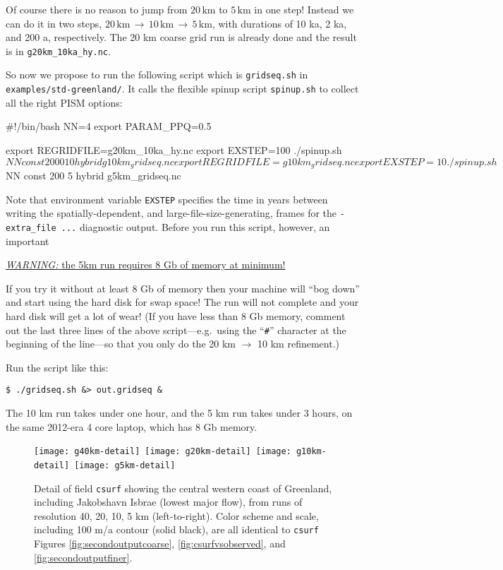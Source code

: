 Of course there is no reason to jump from $20\,\text{km}$ to $5\,\text{km}$ in one step!  Instead we can do it in two steps, $20\,\text{km}\,\to\,10\,\text{km}\,\to\,5\,\text{km}$, with durations of 10 ka, 2 ka, and 200 a, respectively.  The 20 km coarse grid run is already done and the result is in \texttt{g20km_10ka_hy.nc}.

So now we propose to run the following script which is \texttt{gridseq.sh} in \texttt{examples/std-greenland/}.  It calls the flexible spinup script \texttt{spinup.sh} to collect all the right PISM options:
\begin{scriptvrb}
#!/bin/bash
NN=4
export PARAM_PPQ=0.5

export REGRIDFILE=g20km_10ka_hy.nc
export EXSTEP=100
./spinup.sh $NN const 2000  10 hybrid g10km_gridseq.nc

export REGRIDFILE=g10km_gridseq.nc
export EXSTEP=10
./spinup.sh $NN const 200    5 hybrid  g5km_gridseq.nc
\end{scriptvrb}
Note that environment variable \verb|EXSTEP| specifies the time in years between writing the spatially-dependent, and large-file-size-generating, frames for the \verb|-extra_file ...| diagnostic output.  Before you run this script, however, an important

\medskip
\centerline{\large\underline{\emph{WARNING:} the 5km run requires 8 Gb of memory at minimum!}\normalsize}

\medskip
\noindent If you try it without at least 8 Gb of memory then your machine will ``bog down'' and start using the hard disk for swap space!  The run will not complete and your hard disk will get a lot of wear!  (If you have less than 8 Gb memory, comment out the last three lines of the above script---e.g.~using the ``\verb|#|'' character at the beginning of the line---so that you only do the 20 km $\to$ 10 km refinement.)

Run the script like this:
\begin{verbatim}
$ ./gridseq.sh &> out.gridseq &
\end{verbatim}
The 10 km run takes under one hour, and the 5 km run takes under 3 hours, on the same 2012-era 4 core laptop, which has 8 Gb memory.

\begin{figure}[ht]
\centering
\mbox{\texttt{[image: g40km-detail]} \texttt{[image: g20km-detail]} \texttt{[image: g10km-detail]} \texttt{[image: g5km-detail]} }
\caption{Detail of field \texttt{csurf} showing the central western coast of Greenland, including Jakobshavn Isbrae (lowest major flow), from runs of resolution 40, 20, 10, 5 km (left-to-right).  Color scheme and scale, including 100 m/a contour (solid black), are all identical to \texttt{csurf} Figures \ref{fig:secondoutputcoarse}, \ref{fig:csurfvsobserved}, and \ref{fig:secondoutputfiner}.}
\label{fig:gridseqdetail}
\end{figure}

